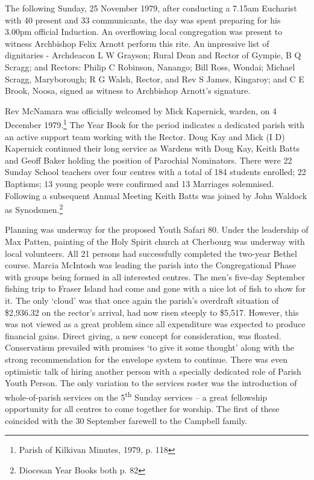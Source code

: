 The following Sunday, 25 November 1979, after conducting a 7.15am Eucharist with 40 present and 33 communicants, the day was spent preparing for his 3.00pm official Induction. An overflowing local congregation was present to witness Archbishop Felix Arnott perform this rite. An impressive list of dignitaries - Archdeacon L W Grayson; Rural Dean and Rector of Gympie, B Q Scragg; and Rectors: Philip C Robinson, Nanango; Bill Ross, Wondai; Michael Scragg, Maryborough; R G Walsh, Rector, and Rev S James, Kingaroy; and C E Brook, Noosa, signed as witness to Archbishop Arnott's signature.

Rev McNamara was officially welcomed by Mick Kapernick, warden, on 4 December 1979.\footnote{Parish of Kilkivan Minutes, 1979, p. 118} The Year Book for the period indicates a dedicated parish with an active support team working with the Rector. Doug Kay and Mick (I D) Kapernick continued their long service as Wardens with Doug Kay, Keith Batts and Geoff Baker holding the position of Parochial Nominators. There were 22 Sunday School teachers over four centres with a total of 184 students enrolled; 22 Baptisms; 13 young people were confirmed and 13 Marriages solemnised. Following a subsequent Annual Meeting Keith Batts was joined by John Waldock as Synodsmen.\footnote{Diocesan Year Books both p. 82}

Planning was underway for the proposed Youth Safari 80. Under the leadership of Max Patten, painting of the Holy Spirit church at Cherbourg was underway with local volunteers. All 21 persons had successfully completed the two-year Bethel course. Marcia McIntosh was leading the parish into the Congregational Phase with groups being formed in all interested centres. The men's five-day September fishing trip to Fraser Island had come and gone with a nice lot of fish to show for it. The only `cloud' was that once again the parish's overdraft situation of \$2,936.32 on the rector's arrival, had now risen steeply to \$5,517. However, this was not viewed as a great problem since all expenditure was expected to produce financial gains. Direct giving, a new concept for consideration, was floated. Conservatism prevailed with promises `to give it some thought' along with the strong recommendation for the envelope system to continue. There was even optimistic talk of hiring another person with a specially dedicated role of Parish Youth Person. The only variation to the services roster was the introduction of whole-of-parish services on the 5\textsuperscript{th} Sunday services -- a great fellowship opportunity for all centres to come together for worship. The first of these coincided with the 30 September farewell to the Campbell family.

